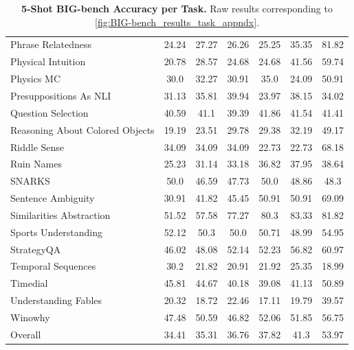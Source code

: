 \documentclass[11pt, a4paper, logo, internal, copyright, nonumbering]{deepmind}
\newcommand{\bigbench}{BIG-bench\xspace}
\begin{document}
\begin{table}[ht]
\begin{tabular}{lcccccc}
Phrase Relatedness &  24.24 & 27.27 & 26.26 & 25.25 & 35.35 & 81.82 \\ 
Physical Intuition &  20.78 & 28.57 & 24.68 & 24.68 & 41.56 & 59.74 \\ 
Physics MC &  30.0 & 32.27 & 30.91 & 35.0 & 24.09 & 50.91 \\ 
Presuppositions As NLI &  31.13 & 35.81 & 39.94 & 23.97 & 38.15 & 34.02 \\ 
Question Selection &  40.59 & 41.1 & 39.39 & 41.86 & 41.54 & 41.41 \\ 
Reasoning About Colored Objects &  19.19 & 23.51 & 29.78 & 29.38 & 32.19 & 49.17 \\ 
Riddle Sense &  34.09 & 34.09 & 34.09 & 22.73 & 22.73 & 68.18 \\ 
Ruin Names &  25.23 & 31.14 & 33.18 & 36.82 & 37.95 & 38.64 \\ 
SNARKS &  50.0 & 46.59 & 47.73 & 50.0 & 48.86 & 48.3 \\ 
Sentence Ambiguity &  30.91 & 41.82 & 45.45 & 50.91 & 50.91 & 69.09 \\ 
Similarities Abstraction &  51.52 & 57.58 & 77.27 & 80.3 & 83.33 & 81.82 \\ 
Sports Understanding &  52.12 & 50.3 & 50.0 & 50.71 & 48.99 & 54.95 \\ 
StrategyQA &  46.02 & 48.08 & 52.14 & 52.23 & 56.82 & 60.97 \\ 
Temporal Sequences &  30.2 & 21.82 & 20.91 & 21.92 & 25.35 & 18.99 \\ 
Timedial &  45.81 & 44.67 & 40.18 & 39.08 & 41.13 & 50.89 \\ 
Understanding Fables &  20.32 & 18.72 & 22.46 & 17.11 & 19.79 & 39.57 \\ 
Winowhy &  47.48 & 50.59 & 46.82 & 52.06 & 51.85 & 56.75 \\ 
\midrule
Overall &  34.41 & 35.31 & 36.76 & 37.82 & 41.3 & 53.97 \\ 
\bottomrule
\end{tabular}
    \caption{\textbf{5-Shot \bigbench Accuracy per Task.} Raw results corresponding to \autoref{fig:BIG-bench_results_task_appndx}.}
    \label{tab:bigbench_raw_results_task}
\end{table}

\clearpage
\end{document}
